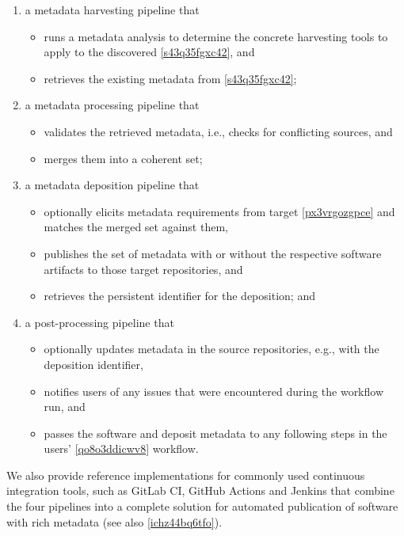 \documentclass{article}
\begin{document}
\begin{enumerate}  
\item a metadata harvesting pipeline that

\begin{itemize}  
\item runs a metadata analysis to determine the concrete harvesting tools to apply to the discovered \ref{s43q35fgxc42}, and


\item retrieves the existing metadata from \ref{s43q35fgxc42};


\end{itemize}\item a metadata processing pipeline that

\begin{itemize}  
\item validates the retrieved metadata, i.e., checks for conflicting sources, and


\item merges them into a coherent set;


\end{itemize}\item a metadata deposition pipeline that

\begin{itemize}  
\item optionally elicits metadata requirements from target \ref{px3vrgozgpce} and matches the merged set against them,


\item publishes the set of metadata with or without the respective software artifacts to those target repositories, and


\item retrieves the persistent identifier for the deposition; and


\end{itemize}\item a post-processing pipeline that 

\begin{itemize}  
\item optionally updates metadata in the source repositories, e.g., with the deposition identifier,


\item notifies users of any issues that were encountered during the workflow run, and


\item passes the software and deposit metadata to any following steps in the users’ \ref{qo8o3ddicwv8} workflow.


\end{itemize}
\end{enumerate}We also provide reference implementations for commonly used continuous integration tools, such as GitLab CI, GitHub Actions and Jenkins that combine the four pipelines into a complete solution for automated publication of software with rich metadata (see also \ref{ichz44bq6tfo}).
\end{document}

